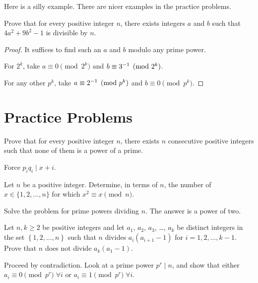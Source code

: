 \documentclass[11pt]{scrartcl}
\begin{document}
Here is a silly example. There are nicer examples in the practice problems.
\begin{example}
  Prove that for every positive integer $n$,
  there exists integers $a$ and $b$ such that $4a^2+9b^2-1$ is divisible by $n$.
\end{example}
\begin{proof}
  It suffices to find such an $a$ and $b$ modulo any prime power.

  For $2^k$, take $a \equiv 0 \pmod{2^k}$ and $b \equiv 3^{-1} \pmod{2^k}$.

  For any other $p^k$, take $a \equiv 2^{-1} \pmod{p^k}$ and $b \equiv 0 \pmod{p^k}$.
\end{proof}

\newpage

\section{Practice Problems}

\begin{problem}
  [IMO 1989] Prove that for every positive integer $n$,
  there exists $n$ consecutive positive integers such that
  none of them is a power of a prime.
  \begin{hint}
    Force $p_i q_i \mid x + i$.
  \end{hint}
\end{problem}

\begin{problem}
  Let $n$ be a positive integer.
  Determine, in terms of $n$, the number of $x \in \{1,2,\dots,n\}$
  for which $x^2 \equiv x \pmod n$.
  \begin{hint}
    Solve the problem for prime powers dividing $n$.
    The answer is a power of two.
  \end{hint}
\end{problem}

\begin{problem}
  [IMO 2009/1]
  Let $n, k \ge 2$ be positive integers and let $a_1$, $a_2$, $a_3$, \dots, $a_k$
  be distinct integers in the set $\left\{ 1,2,\dots,n \right\}$
  such that $n$ divides $a_i(a_{i+1} - 1)$ for $i = 1,2,\dots,k-1$.
  Prove that $n$ does not divide $a_k(a_1 - 1)$.
  \begin{hint}
    Proceed by contradiction.
    Look at a prime power $p^r \mid n$,
    and show that either $a_i \equiv 0 \pmod{p^r} \; \forall i$ or $a_i \equiv 1 \pmod{p^r} \; \forall i$.
  \end{hint}
\end{problem}
\end{document}
